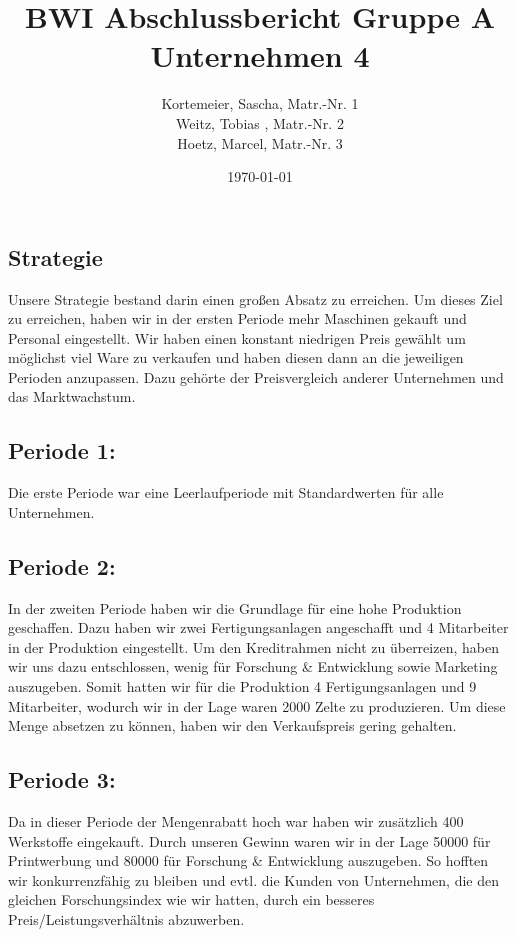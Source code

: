 \documentclass[a4paper, 12pt]{report}
\title{BWI Abschlussbericht Gruppe A Unternehmen 4}
\author{Kortemeier, Sascha, Matr.-Nr. 1 \\
Weitz, Tobias , Matr.-Nr. 2 \\
Hoetz, Marcel, Matr.-Nr. 3}
\date{\today}
\begin{document}
\maketitle
\tableofcontents



\begin{flushleft}
\chapter{Strategie}
Unsere Strategie bestand darin einen großen Absatz zu erreichen. 
Um dieses Ziel zu erreichen, haben wir in der ersten Periode mehr Maschinen gekauft und Personal eingestellt. 
Wir haben einen konstant niedrigen Preis gewählt um möglichst viel Ware zu verkaufen und haben diesen dann an die jeweiligen Perioden anzupassen. 
Dazu gehörte der Preisvergleich anderer Unternehmen und das Marktwachstum. 

\section{Periode 1:}
Die erste Periode war eine Leerlaufperiode mit Standardwerten für alle Unternehmen.	

\section{Periode 2:}
In der zweiten Periode haben wir die Grundlage für eine hohe Produktion geschaffen.
Dazu haben wir zwei Fertigungsanlagen angeschafft und 4 Mitarbeiter in der Produktion eingestellt.
Um den Kreditrahmen nicht zu überreizen, haben wir uns dazu entschlossen, wenig für Forschung \& Entwicklung sowie Marketing auszugeben.
Somit hatten wir für die Produktion 4 Fertigungsanlagen und 9 Mitarbeiter, wodurch wir in der Lage waren 2000 Zelte zu produzieren.
Um diese Menge absetzen zu können, haben wir den Verkaufspreis gering gehalten.

\section{Periode 3:}
Da in dieser Periode der Mengenrabatt hoch war haben wir zusätzlich 400 Werkstoffe eingekauft. 
Durch unseren Gewinn waren wir in der Lage 50000\texteuro{} für Printwerbung und 80000\texteuro{} für Forschung \& Entwicklung auszugeben.
So hofften wir konkurrenzfähig zu bleiben und evtl. die Kunden von Unternehmen, die den gleichen Forschungsindex wie wir hatten, durch ein besseres Preis/Leistungsverhältnis abzuwerben.


\end{flushleft}
\end{document}

